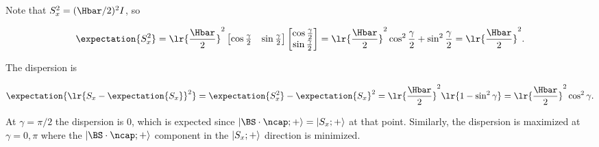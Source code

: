 {Note that \( S_x^2 = (\Hbar/2)^2I \), so

\begin{dmath}\label{eqn:moreBraKetProblems:800}
\expectation{S_x^2}
=
\lr{\frac{\Hbar}{2}}^2
\begin{bmatrix}
\cos\frac{\gamma}{2} & \sin\frac{\gamma}{2}
\end{bmatrix}
\begin{bmatrix}
\cos\frac{\gamma}{2} \\
\sin\frac{\gamma}{2}
\end{bmatrix}
=
\lr{ \frac{\Hbar}{2} }^2
\cos^2\frac{\gamma}{2} + \sin^2 \frac{\gamma}{2}
=
\lr{ \frac{\Hbar}{2} }^2.
\end{dmath}

The dispersion is

\begin{dmath}\label{eqn:moreBraKetProblems:820}
\expectation{\lr{ S_x - \expectation{S_x}}^2}
=
\expectation{S_x^2} - \expectation{S_x}^2
=
\lr{ \frac{\Hbar}{2} }^2
\lr{1 - \sin^2 \gamma}
=
\lr{ \frac{\Hbar}{2} }^2
\cos^2 \gamma.
\end{dmath}

At \( \gamma = \pi/2 \) the dispersion is 0, which is expected since \( \ket{\BS \cdot \ncap ; + } = \ket{ S_x ; + } \) at that point.  Similarly, the dispersion is maximized at \( \gamma = 0,\pi \) where the \( \ket{\BS \cdot \ncap ; + } \) component in the \( \left\lvert {S_x ; + } \right\rangle \) direction is minimized.

} %
